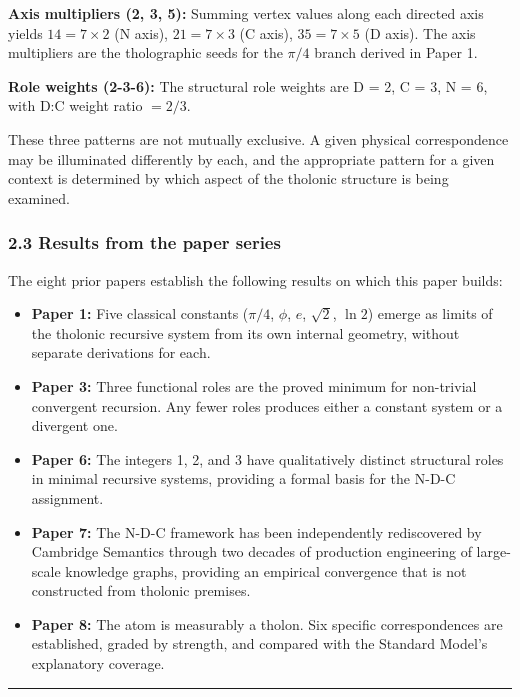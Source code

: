\documentclass[
  11pt,
  letterpaper,
]{article}
\providecommand{\tightlist}{%
  \setlength{\itemsep}{0pt}\setlength{\parskip}{0pt}}
\begin{document}
\textbf{Axis multipliers (2, 3, 5):} Summing vertex values along each
directed axis yields \(14 = 7 \times 2\) (N axis), \(21 = 7 \times 3\)
(C axis), \(35 = 7 \times 5\) (D axis). The axis multipliers are the
tholographic seeds for the \(\pi/4\) branch derived in Paper 1.

\textbf{Role weights (2-3-6):} The structural role weights are D = 2, C
= 3, N = 6, with D:C weight ratio \(= 2/3\).

These three patterns are not mutually exclusive. A given physical
correspondence may be illuminated differently by each, and the
appropriate pattern for a given context is determined by which aspect of
the tholonic structure is being examined.

\subsubsection{2.3 Results from the paper
series}\label{results-from-the-paper-series}

The eight prior papers establish the following results on which this
paper builds:

\begin{itemize}
\tightlist
\item
  \textbf{Paper 1:} Five classical constants (\(\pi/4\), \(\phi\),
  \(e\), \(\sqrt{2}\), \(\ln 2\)) emerge as limits of the tholonic
  recursive system from its own internal geometry, without separate
  derivations for each.
\item
  \textbf{Paper 3:} Three functional roles are the proved minimum for
  non-trivial convergent recursion. Any fewer roles produces either a
  constant system or a divergent one.
\item
  \textbf{Paper 6:} The integers 1, 2, and 3 have qualitatively distinct
  structural roles in minimal recursive systems, providing a formal
  basis for the N-D-C assignment.
\item
  \textbf{Paper 7:} The N-D-C framework has been independently
  rediscovered by Cambridge Semantics through two decades of production
  engineering of large-scale knowledge graphs, providing an empirical
  convergence that is not constructed from tholonic premises.
\item
  \textbf{Paper 8:} The atom is measurably a tholon. Six specific
  correspondences are established, graded by strength, and compared with
  the Standard Model's explanatory coverage.
\end{itemize}

\begin{center}\rule{0.5\linewidth}{0.5pt}\end{center}
\end{document}
